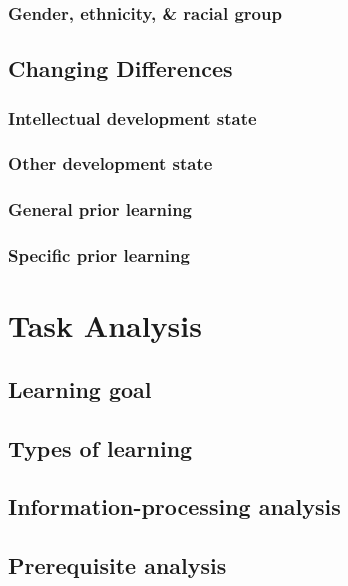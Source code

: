 \documentclass[12pt]{report} %
\begin{document}
\subsection{Gender, ethnicity, \& racial group}


\section{Changing Differences}

\subsection{Intellectual development state}

\subsection{Other development state}

\subsection{General prior learning}

\subsection{Specific prior learning}


\chapter{Task Analysis}

\section{Learning goal}

\section{Types of learning}

\section{Information-processing analysis}

\section{Prerequisite analysis}
\end{document}
